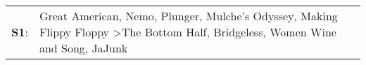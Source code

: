 \begin{supertabular}{p{0.03\textwidth}p{0.92\textwidth}}
 \textbf{S1}:  &  Great American\textsuperscript{}, \enspace Nemo\textsuperscript{}, \enspace Plunger\textsuperscript{}, \enspace Mulche's Odyssey\textsuperscript{}, \enspace Making Flippy Floppy\textsuperscript{} \textgreater \enspace The Bottom Half\textsuperscript{}, \enspace Bridgeless\textsuperscript{}, \enspace Women Wine and Song\textsuperscript{}, \enspace JaJunk\textsuperscript{}  \enspace  \\
\end{supertabular}
